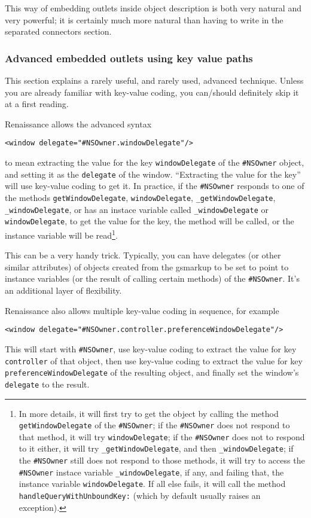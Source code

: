 This way of embedding outlets inside object description is both very
natural and very powerful; it is certainly much more natural than
having to write in the separated connectors section.

\subsubsection{Advanced embedded outlets using key value paths}
This section explains a rarely useful, and rarely used, advanced
technique.  Unless you are already familiar with key-value coding, you
can/should definitely skip it at a first reading.

Renaissance allows the advanced syntax
\begin{verbatim}
<window delegate="#NSOwner.windowDelegate"/>
\end{verbatim}
to mean extracting the value for the key \texttt{windowDelegate} of
the \texttt{\#NSOwner} object, and setting it as the \texttt{delegate}
of the window.  ``Extracting the value for the key'' will use
key-value coding to get it.  In practice, if the \texttt{\#NSOwner}
responds to one of the methods \texttt{getWindowDelegate},
\texttt{windowDelegate}, \texttt{\_getWindowDelegate}, 
\texttt{\_windowDelegate}, or has an instace variable called 
\texttt{\_windowDelegate} or \texttt{windowDelegate}, to get the value
for the key, the method will be called, or the instance variable
will be read\footnote{In more details, it will first try to get the
object by calling the method \texttt{getWindowDelegate} of the
\texttt{\#NSOwner}; if the \texttt{\#NSOwner} does not respond to that
method, it will try \texttt{windowDelegate}; if the \texttt{\#NSOwner}
does not to respond to it either, it will try
\texttt{\_getWindowDelegate}, and then \texttt{\_windowDelegate}; if the
\texttt{\#NSOwner} still does not respond to those methods, it will
try to access the \texttt{\#NSOwner} instace variable
\texttt{\_windowDelegate}, if any, and failing that, the instance variable
\texttt{windowDelegate}.  If all else fails, it will call the method
\texttt{handleQueryWithUnboundKey:} (which by default 
usually raises an exception).}.

This can be a very handy trick.  Typically, you can have delegates (or
other similar attributes) of objects created from the gsmarkup to be
set to point to instance variables (or the result of calling certain
methods) of the \texttt{\#NSOwner}.  It's an additional layer of
flexibility.

Renaissance also allows multiple key-value coding in sequence, for example
\begin{verbatim}
<window delegate="#NSOwner.controller.preferenceWindowDelegate"/>
\end{verbatim}
This will start with \texttt{\#NSOwner}, use key-value coding to
extract the value for key \texttt{controller} of that object, then use
key-value coding to extract the value for key
\texttt{preferenceWindowDelegate} of the resulting object, and finally
set the window's \texttt{delegate} to the result.

